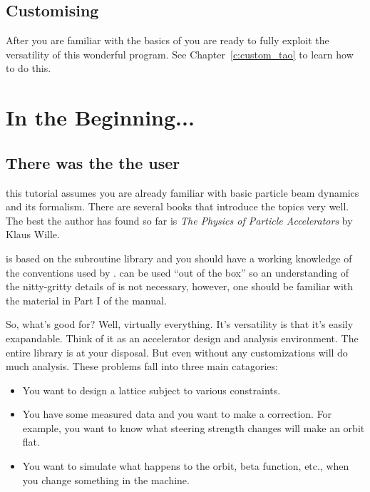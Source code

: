 \subsection{Customising \tao}

After you are familiar with the basics of \tao you are ready to fully exploit
the versatility of this wonderful program. See Chapter~\ref{c:custom_tao} to learn
how to do this.

\section{In the Beginning...}
\label{s:beginning}

\subsection{There was the the user}

this tutorial assumes you are already familiar with basic particle beam
dynamics and its formalism. There are several books that introduce the topics
very well. The best the author has found so far is \textit{The Physics of
Particle Accelerators} by Klaus Wille. 

\tao is based on the \bmad subroutine library and you should have
a working knowledge of the conventions used by \bmad. \tao can be used ``out of
the box'' so an understanding of the nitty-gritty details of \bmad is not
necessary, however, one should be familiar with the material in Part I
of the \bmad manual.

So, what's \tao good for? Well, virtually everything. It's versatility is that
it's easily exapandable. Think of it as an accelerator design and analysis
environment. The entire \bmad library is at your disposal. But even without any 
customizations \tao will do much analysis. These problems fall into three main
catagories:

\begin{itemize}
\item 
You want to design a lattice subject to various constraints.
\item 
You have some measured data and you want to make a correction. For
example, you want to know what steering strength changes will make an orbit
flat.
\item
You want to simulate what happens to the orbit, beta function,
etc., when you change something in the machine.
\end{itemize}

